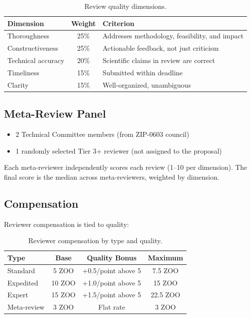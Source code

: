 \documentclass[11pt,letterpaper]{article}
\begin{document}
\begin{table}[h]
\centering
\caption{Review quality dimensions.}
\label{tab:quality}
\begin{tabular}{lcp{6cm}}
\toprule
\textbf{Dimension} & \textbf{Weight} & \textbf{Criterion} \\
\midrule
Thoroughness & 25\% & Addresses methodology, feasibility, and impact \\
Constructiveness & 25\% & Actionable feedback, not just criticism \\
Technical accuracy & 20\% & Scientific claims in review are correct \\
Timeliness & 15\% & Submitted within deadline \\
Clarity & 15\% & Well-organized, unambiguous \\
\bottomrule
\end{tabular}
\end{table}

\subsection{Meta-Review Panel}

\begin{itemize}
    \item 2 Technical Committee members (from ZIP-0603 council)
    \item 1 randomly selected Tier 3+ reviewer (not assigned to the proposal)
\end{itemize}

Each meta-reviewer independently scores each review (1--10 per dimension). The final score is the median across meta-reviewers, weighted by dimension.

\subsection{Compensation}

Reviewer compensation is tied to quality:

\begin{table}[h]
\centering
\caption{Reviewer compensation by type and quality.}
\label{tab:comp}
\begin{tabular}{lccc}
\toprule
\textbf{Type} & \textbf{Base} & \textbf{Quality Bonus} & \textbf{Maximum} \\
\midrule
Standard & 5 ZOO & +0.5/point above 5 & 7.5 ZOO \\
Expedited & 10 ZOO & +1.0/point above 5 & 15 ZOO \\
Expert & 15 ZOO & +1.5/point above 5 & 22.5 ZOO \\
Meta-review & 3 ZOO & Flat rate & 3 ZOO \\
\bottomrule
\end{tabular}
\end{table}
\end{document}
